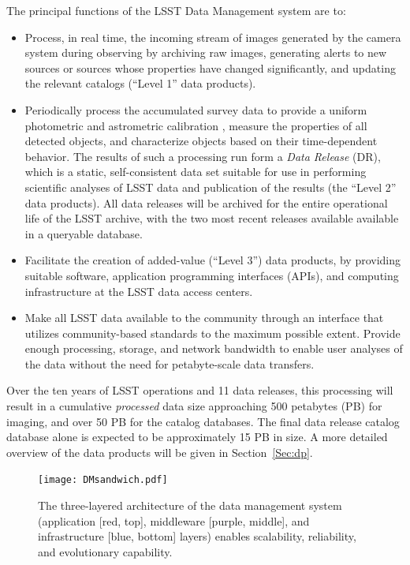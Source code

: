 \documentclass[11pt,twoside]{article}
\begin{document}
The principal functions of the LSST Data Management system are to:
\begin{itemize}
\item Process, in real time, the incoming stream of images generated by the camera system during observing by archiving raw images, generating alerts to new sources or sources whose properties have changed significantly, and updating the relevant catalogs (``Level 1'' data products).
\item Periodically process the accumulated survey data to provide a
  uniform photometric and astrometric calibration \citep{LSE-180}, measure the
  properties of all detected objects, and characterize objects based on their time-dependent behavior. The results of such a processing run form a {\em Data Release} (DR), which is a static, self-consistent data set suitable for use in performing scientific analyses of LSST data and publication of the results (the ``Level 2'' data products). All data releases will be archived for the entire operational life of the LSST
archive, with the two most recent releases available available in a
queryable database.
\item Facilitate the creation of added-value (``Level 3'') data products, by providing suitable software,
  application programming interfaces (APIs),
and computing infrastructure at the LSST data access centers.
\item Make all LSST data available to the community through an interface that utilizes
community-based standards   to the maximum possible extent. Provide
  enough processing, storage, and network bandwidth to enable user
  analyses of the data without the need for petabyte-scale data
  transfers.
\end{itemize}

Over the ten years of LSST operations and 11 data releases, this processing will result in a cumulative {\em processed} data size
approaching 500 petabytes (PB) for imaging, and over 50 PB for the
catalog databases. The final data release catalog database alone is expected
to be approximately 15 PB in size. A more detailed overview of the data products will be given in Section~\ref{Sec:dp}.
\\

\begin{figure}[!t]
%
%
\begin{center}
\texttt{[image: DMsandwich.pdf]}
\end{center}
\caption{The three-layered architecture of the data management system
(application [red, top], middleware [purple, middle], and infrastructure [blue, bottom] layers) enables scalability, reliability, and evolutionary capability.}
\label{Fig:DM1}
\end{figure}
\end{document}
